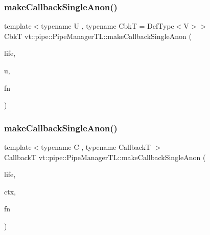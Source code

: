 \subsubsection{\texorpdfstring{make\+Callback\+Single\+Anon()}{makeCallbackSingleAnon()}\hspace{0.1cm}{\footnotesize\ttfamily [3/6]}}
{\footnotesize\ttfamily template$<$typename U , typename CbkT  = Def\+Type$<$\+V$>$$>$ \\
CbkT vt\+::pipe\+::\+Pipe\+Manager\+T\+L\+::make\+Callback\+Single\+Anon (\begin{DoxyParamCaption}\item[{\hyperlink{namespacevt_1_1pipe_acb42b284378c0fdac1d7c6335dc26f58}{Lifetime\+Enum}}]{life,  }\item[{U $\ast$}]{u,  }\item[{\hyperlink{structvt_1_1pipe_1_1_pipe_manager_base_ad8463823b6b4cfdb67c119d6d22e3bac}{Func\+Ctx\+Type}$<$ U $>$}]{fn }\end{DoxyParamCaption})}

\mbox{\label{structvt_1_1pipe_1_1_pipe_manager_t_l_ac74f387c8ea9f25e11ca53841cd01779}} 
\subsubsection{\texorpdfstring{make\+Callback\+Single\+Anon()}{makeCallbackSingleAnon()}\hspace{0.1cm}{\footnotesize\ttfamily [4/6]}}
{\footnotesize\ttfamily template$<$typename C , typename CallbackT $>$ \\
CallbackT vt\+::pipe\+::\+Pipe\+Manager\+T\+L\+::make\+Callback\+Single\+Anon (\begin{DoxyParamCaption}\item[{\hyperlink{namespacevt_1_1pipe_acb42b284378c0fdac1d7c6335dc26f58}{Lifetime\+Enum}}]{life,  }\item[{C $\ast$}]{ctx,  }\item[{\hyperlink{structvt_1_1pipe_1_1_pipe_manager_base_ad8463823b6b4cfdb67c119d6d22e3bac}{Func\+Ctx\+Type}$<$ C $>$}]{fn }\end{DoxyParamCaption})}

\mbox{\label{structvt_1_1pipe_1_1_pipe_manager_t_l_aa84891c7d419709ee96473a895d07ae7}} 
